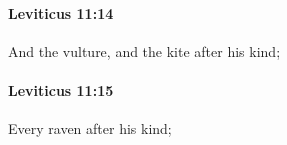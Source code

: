 		\paragraph{Leviticus 11:14} %
			\label{LEVITICUS-11-14}

			And the vulture, and the kite after his kind;


		\paragraph{Leviticus 11:15} %
			\label{LEVITICUS-11-15}

			Every raven after his kind;


